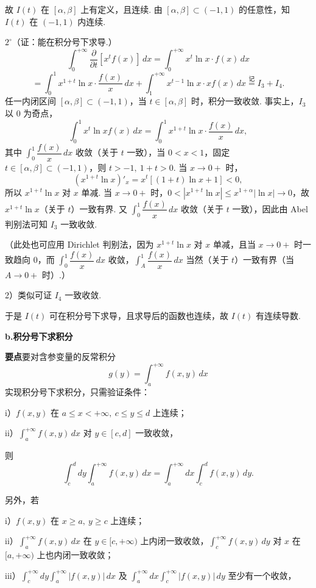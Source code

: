 \documentclass[UTF8,12pt,a4paper,fontset=fandol]{ctexart}
\begin{document}
故 $I(t)$ 在 $[\alpha,\beta]$ 上有定义，且连续. 由 $[\alpha,\beta]\subset(-1,1)$ 的任意性，知 $I(t)$ 在 $(-1,1)$ 内连续.

$2^\circ$（证：能在积分号下求导.）
\[
\int_0^{+\infty}\frac{\partial}{\partial t}[x^tf(x)]\,dx
=\int_0^{+\infty}x^t\ln x\cdot f(x)\,dx
\]
\[
=\int_0^1x^{1+t}\ln x\cdot\frac{f(x)}x\,dx
+\int_1^{+\infty}x^{t-1}\ln x\cdot xf(x)\,dx\overset{\text{记}}{=}I_3+I_4.
\tag{1}
\]
任一内闭区间 $[\alpha,\beta]\subset(-1,1)$，当 $t\in[\alpha,\beta]$ 时，积分一致收敛. 事实上，$I_3$ 以 0 为奇点，
\[
\int_0^1x^t\ln x f(x)\,dx
=\int_0^1x^{1+t}\ln x\cdot\frac{f(x)}x\,dx,
\]
其中 $\displaystyle\int_0^1\dfrac{f(x)}x\,dx$ 收敛（关于 $t$ 一致），当 $0<x<1$，固定 $t\in[\alpha,\beta]\subset(-1,1)$，则 $t>-1,\ 1+t>0$. 当 $x\to0+$ 时，
\[
(x^{1+t}\ln x)'_x=x^t[(1+t)\ln x+1]<0,
\]
所以 $x^{1+t}\ln x$ 对 $x$ 单减. 当 $x\to0+$ 时，$0<|x^{1+t}\ln x|\le x^{1+\alpha}|\ln x|\to0$，故 $x^{1+t}\ln x$（关于 $t$）一致有界. 又 $\displaystyle\int_0^1\dfrac{f(x)}x\,dx$ 收敛（关于 $t$ 一致），因此由 Abel 判别法可知 $I_3$ 一致收敛.

（此处也可应用 Dirichlet 判别法，因为 $x^{1+t}\ln x$ 对 $x$ 单减，且当 $x\to0+$ 时一致趋向 0，而 $\displaystyle\int_0^1\dfrac{f(x)}x\,dx$ 收敛，$\displaystyle\int_A^1\dfrac{f(x)}x\,dx$ 当然（关于 $t$）一致有界（当 $A\to0+$ 时）.）

2）类似可证 $I_4$ 一致收敛.

于是 $I(t)$ 可在积分号下求导，且求导后的函数也连续，故 $I(t)$ 有连续导数.

\noindent\textbf{b.\quad 积分号下求积分}

\noindent\textbf{要点}\quad 要对含参变量的反常积分
\[
g(y)=\int_a^{+\infty}f(x,y)\,dx
\]
实现积分号下求积分，只需验证条件：

i）$f(x,y)$ 在 $a\le x<+\infty,\ c\le y\le d$ 上连续；

ii）$\displaystyle\int_a^{+\infty}f(x,y)\,dx$ 对 $y\in[c,d]$ 一致收敛，

则
\[
\int_c^d dy\int_a^{+\infty}f(x,y)\,dx
=\int_a^{+\infty}dx\int_c^d f(x,y)\,dy.
\]

另外，若

i）$f(x,y)$ 在 $x\ge a,\ y\ge c$ 上连续；

ii）$\displaystyle\int_a^{+\infty}f(x,y)\,dx$ 在 $y\in[c,+\infty)$ 上内闭一致收敛，$\displaystyle\int_c^{+\infty}f(x,y)\,dy$ 对 $x$ 在 $[a,+\infty)$ 上也内闭一致收敛；

iii）$\displaystyle\int_c^{+\infty}dy\int_a^{+\infty}|f(x,y)|\,dx$ 及 $\displaystyle\int_a^{+\infty}dx\int_c^{+\infty}|f(x,y)|\,dy$ 至少有一个收敛，
\end{document}
